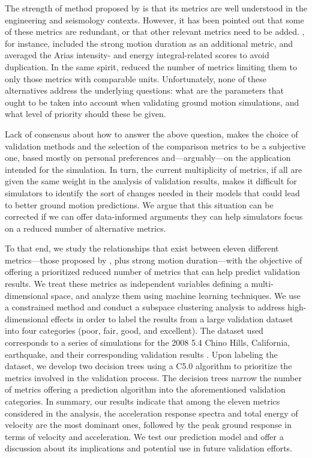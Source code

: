 The strength of method proposed by \citet{Anderson_2004_Proc} is that its metrics are well understood in the engineering and seismology contexts. However, it has been pointed out that some of these metrics are redundant, or that other relevant metrics need to be added. \citet{Taborda_2013_BSSA}, for instance, included the strong motion duration \citep{Trifunac_1975_BSSA} as an additional metric, and averaged the Arias intensity- and energy integral-related scores to avoid duplication. In the same spirit, \citet{Maufroy_2015_BSSA} reduced the number of metrics limiting them to only those metrics with comparable units. Unfortunately, none of these alternatives address the underlying questions: what are the parameters that ought to be taken into account when validating ground motion simulations, and what level of priority should these be given.

Lack of consensus about how to answer the above question, makes the choice of validation methods and the selection of the comparison metrics to be a subjective one, based mostly on personal preferences and---arguably---on the application intended for the simulation. In turn, the current multiplicity of metrics, if all are given the same weight in the analysis of validation results, makes it difficult for simulators to identify the sort of changes needed in their models that could lead to better ground motion predictions. We argue that this situation can be corrected if we can offer data-informed arguments they can help simulators focus on a reduced number of alternative metrics.

To that end, we study the relationships that exist between eleven different metrics---those proposed by \citet{Anderson_2004_Proc}, plus strong motion duration---with the objective of offering a prioritized reduced number of metrics that can help predict validation results. We treat these metrics as independent variables defining a multi-dimensional space, and analyze them using machine learning techniques. We use a constrained \kmeans{} method and conduct a subspace clustering analysis to address high-dimensional effects in order to label the results from a large validation dataset into four categories (poor, fair, good, and excellent). The dataset used corresponds to a series of simulations for the 2008  5.4 Chino Hills, California, earthquake, and their corresponding validation results \citep{Taborda_2014_BSSA}. Upon labeling the dataset, we develop two decision trees using a C5.0 algorithm to prioritize the metrics involved in the validation process. The decision trees narrow the number of metrics offering a prediction algorithm into the aforementioned validation categories. In summary, our results indicate that among the eleven metrics considered in the analysis, the acceleration response spectra and total energy of velocity are the most dominant ones, followed by the peak ground response in terms of velocity and acceleration. We test our prediction model and offer a discussion about its implications and potential use in future validation efforts.

